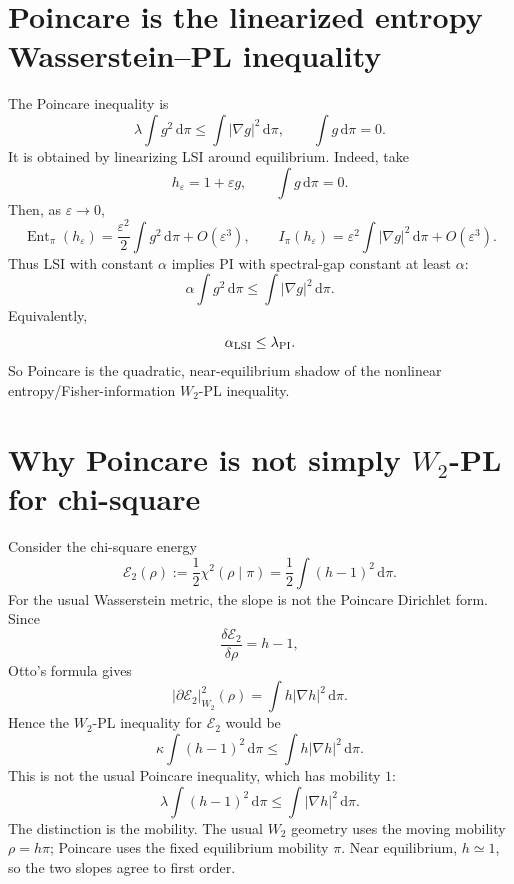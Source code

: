 \documentclass[11pt]{article}
\DeclareMathOperator{\Ent}{Ent}
\newcommand{\dd}{\,\mathrm d}
\newcommand{\E}{\mathcal E}
\begin{document}
\section{Poincare is the linearized entropy Wasserstein--PL inequality}

The Poincare inequality is
\begin{equation}
        \lambda\int g^2\dd\pi
        \le
        \int |\nabla g|^2\dd\pi,
        \qquad \int g\dd\pi=0.
        \tag{PI}
\end{equation}
It is obtained by linearizing LSI around equilibrium. Indeed, take
\[
        h_\varepsilon=1+\varepsilon g,
        \qquad \int g\dd\pi=0.
\]
Then, as $\varepsilon\to0$,
\[
        \Ent_\pi(h_\varepsilon)
        =\frac{\varepsilon^2}{2}\int g^2\dd\pi+O(\varepsilon^3),
        \qquad
        I_\pi(h_\varepsilon)
        =\varepsilon^2\int |\nabla g|^2\dd\pi+O(\varepsilon^3).
\]
Thus LSI with constant $\alpha$ implies PI with spectral-gap constant at least $\alpha$:
\[
        \alpha\int g^2\dd\pi
        \le
        \int |\nabla g|^2\dd\pi.
\]
Equivalently,
\[
        \alpha_{\rm LSI}\le \lambda_{\rm PI}.
\]
So Poincare is the quadratic, near-equilibrium shadow of the nonlinear entropy/Fisher-information $W_2$-PL inequality.

\section{Why Poincare is not simply $W_2$-PL for chi-square}

Consider the chi-square energy
\[
        \E_2(\rho)
        :=\frac12\chi^2(\rho\mid\pi)
        =\frac12\int (h-1)^2\dd\pi.
\]
For the usual Wasserstein metric, the slope is not the Poincare Dirichlet form. Since
\[
        \frac{\delta \E_2}{\delta \rho}=h-1,
\]
Otto's formula gives
\begin{equation}
        |\partial \E_2|_{W_2}^2(\rho)
        =\int h|\nabla h|^2\dd\pi.
        \tag{$W_2$ slope of $\chi^2$}
\end{equation}
Hence the $W_2$-PL inequality for $\E_2$ would be
\begin{equation}
        \kappa\int (h-1)^2\dd\pi
        \le
        \int h|\nabla h|^2\dd\pi.
        \tag{$W_2$-PL-$\chi^2$}
\end{equation}
This is not the usual Poincare inequality, which has mobility $1$:
\[
        \lambda\int (h-1)^2\dd\pi
        \le
        \int |\nabla h|^2\dd\pi.
\]
The distinction is the mobility. The usual $W_2$ geometry uses the moving mobility $\rho=h\pi$; Poincare uses the fixed equilibrium mobility $\pi$. Near equilibrium, $h\simeq1$, so the two slopes agree to first order.
\end{document}
